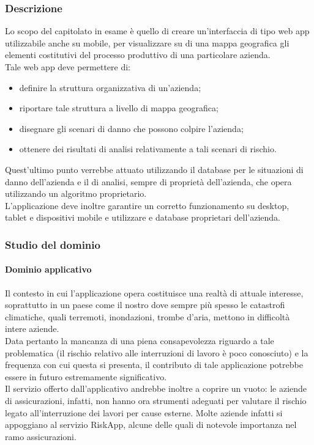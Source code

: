 		\subsubsection{Descrizione}
		Lo scopo del capitolato in esame è quello di creare un'interfaccia di tipo web app utilizzabile anche su mobile, per visualizzare su di una 
		mappa geografica gli elementi costitutivi del processo produttivo di una particolare azienda.
		\\Tale web app deve permettere di:
		\begin{itemize}
			\item definire la struttura organizzativa di un'azienda;
			\item riportare tale struttura a livello di mappa geografica;
			\item disegnare gli scenari di danno che possono colpire l'azienda;
			\item ottenere dei risultati di analisi relativamente a tali scenari di rischio.
		\end{itemize}
		Quest'ultimo punto verrebbe attuato utilizzando il database per le situazioni di danno dell'azienda e il  di analisi, sempre di proprietà dell'azienda,
		che opera utilizzando un algoritmo proprietario.
		\\L'applicazione deve inoltre garantire un corretto funzionamento su desktop, tablet e dispositivi mobile e utilizzare  e database proprietari dell'azienda.
		\subsubsection{Studio del dominio}
			\paragraph{Dominio applicativo}
			Il contesto in cui l'applicazione opera costituisce una realtà di attuale interesse, soprattutto in un paese come il nostro dove sempre più spesso le catastrofi climatiche,
			quali terremoti, inondazioni, trombe d'aria, mettono in difficoltà intere aziende.
			\\Data pertanto la mancanza di una piena consapevolezza riguardo a tale problematica (il rischio relativo alle interruzioni di lavoro è poco conosciuto) 
			e la frequenza con cui questa si presenta, il contributo di tale applicazione potrebbe essere in futuro estremamente significativo.
			\\Il servizio offerto dall'applicativo andrebbe inoltre a coprire un vuoto: le aziende di assicurazioni, infatti, non hanno ora strumenti 
			adeguati per valutare il rischio legato all'interruzione dei lavori per cause esterne. Molte aziende infatti si appoggiano al servizio 
			RiskApp, alcune delle quali di notevole importanza nel ramo assicurazioni.
